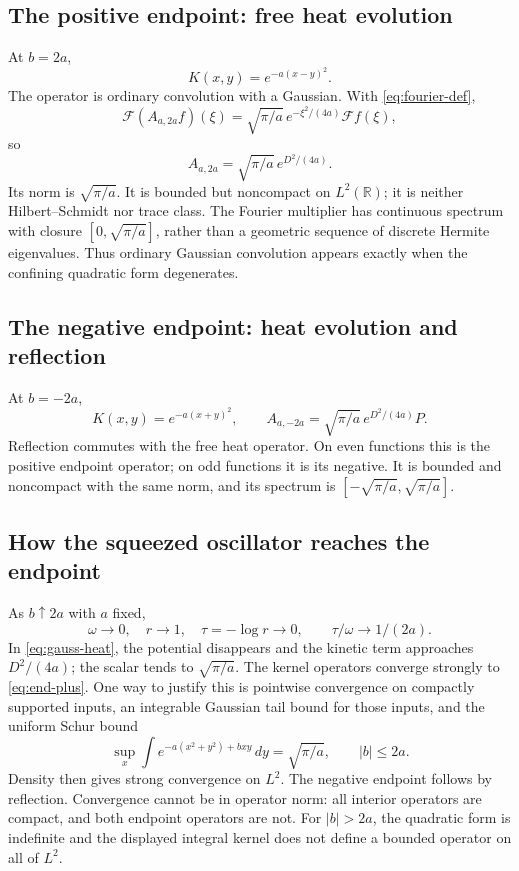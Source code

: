 \documentclass[11pt,reqno]{amsart}
\theoremstyle{remark}\newtheorem{remark}[proposition]{Remark}
\newcommand{\R}{\mathbb R}\newcommand{\F}{\mathcal F}
\begin{document}
\subsection{The positive endpoint: free heat evolution}
At $b=2a$,
\[
 K(x,y)=e^{-a(x-y)^2}.
\]
The operator is ordinary convolution with a Gaussian. With
\eqref{eq:fourier-def},
\[
 \F(A_{a,2a}f)(\xi)=\sqrt{\pi/a}\,e^{-\xi^2/(4a)}\F f(\xi),
\]
so
\begin{equation}\label{eq:end-plus}
 \boxed{A_{a,2a}=\sqrt{\pi/a}\,e^{D^2/(4a)}.}
\end{equation}
Its norm is $\sqrt{\pi/a}$. It is bounded but noncompact on $L^2(\R)$;
it is neither Hilbert--Schmidt nor trace class. The Fourier multiplier
has continuous spectrum with closure $[0,\sqrt{\pi/a}]$, rather than a
geometric sequence of discrete Hermite eigenvalues.
Thus ordinary Gaussian convolution appears exactly when the confining
quadratic form degenerates.

\subsection{The negative endpoint: heat evolution and reflection}
At $b=-2a$,
\[
 K(x,y)=e^{-a(x+y)^2},\qquad
 \boxed{A_{a,-2a}=\sqrt{\pi/a}\,e^{D^2/(4a)}P.}
\]
Reflection commutes with the free heat operator. On even functions this
is the positive endpoint operator; on odd functions it is its negative.
It is bounded and noncompact with the same norm, and its spectrum is
$[-\sqrt{\pi/a},\sqrt{\pi/a}]$.

\subsection{How the squeezed oscillator reaches the endpoint}
As $b\uparrow2a$ with $a$ fixed,
\[
 \omega\to0,\quad r\to1,\quad \tau=-\log r\to0,
 \qquad \tau/\omega\to1/(2a).
\]
In \eqref{eq:gauss-heat}, the potential disappears and the kinetic term
approaches $D^2/(4a)$; the scalar tends to $\sqrt{\pi/a}$.
The kernel operators converge strongly to \eqref{eq:end-plus}. One way
to justify this is pointwise convergence on compactly supported inputs,
an integrable Gaussian tail bound for those inputs, and the uniform
Schur bound
\[
 \sup_x\int e^{-a(x^2+y^2)+bxy}\,dy
 =\sqrt{\pi/a},\qquad |b|\le2a.
\]
Density then gives strong convergence on $L^2$. The negative endpoint
follows by reflection. Convergence cannot be in operator norm: all
interior operators are compact, and both endpoint operators are not.
For $|b|>2a$, the quadratic form is indefinite and the displayed
integral kernel does not define a bounded operator on all of $L^2$.
\end{document}
